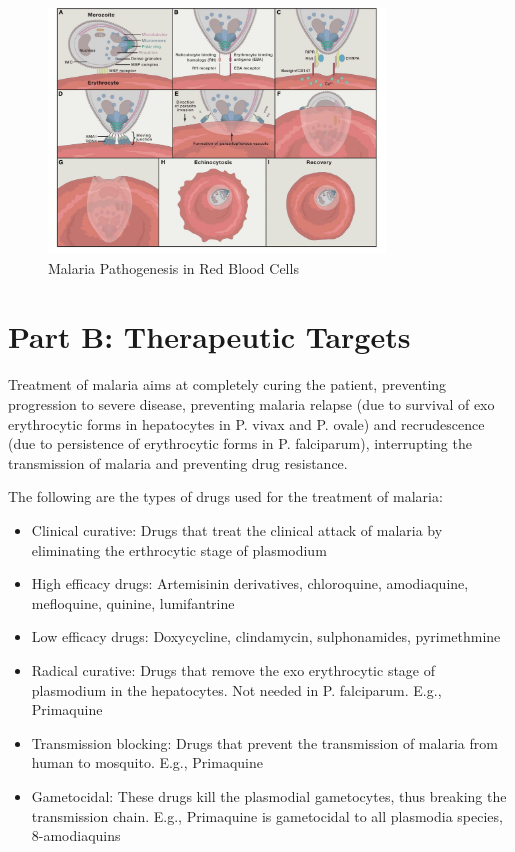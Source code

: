 \documentclass[twoside]{article}
\begin{document}
\begin{figure}[H]
    \centering
    \includegraphics[width=0.8\textwidth]{erythrocytemolmap.jpg}
    \caption{Malaria Pathogenesis in Red Blood Cells}
    \label{fig: Malaria Pathogenesis in Red Blood Cells}
\end{figure}


\section*{Part B: Therapeutic Targets}

\begin{multicols}{2}

    Treatment of malaria aims at completely curing the patient,
    preventing progression to severe disease, preventing malaria
    relapse (due to survival of exo erythrocytic forms in hepatocytes in P. vivax and P. ovale) and recrudescence 
    (due to persistence of erythrocytic forms in P. falciparum), interrupting
    the transmission of malaria and preventing drug resistance.

    The following are the types of drugs used for the treatment of malaria:
    \begin{itemize}
        \item Clinical curative: Drugs that treat the clinical attack of
        malaria by eliminating the erthrocytic stage of
        plasmodium
        \item High efficacy drugs: Artemisinin derivatives, chloroquine, amodiaquine, mefloquine, quinine, lumifantrine
        \item Low efficacy drugs: Doxycycline, clindamycin, sulphonamides, pyrimethmine
        \item Radical curative: Drugs that remove the exo erythrocytic stage of plasmodium in the hepatocytes. 
        Not needed in P. falciparum. E.g., Primaquine
        \item Transmission blocking: Drugs that prevent the transmission of malaria from human to mosquito. E.g., Primaquine
        \item Gametocidal: These drugs kill the plasmodial gametocytes, thus breaking the transmission chain. E.g.,
              Primaquine is gametocidal to all plasmodia species, 8-amodiaquins
    \end{itemize}
            
    
\end{multicols}
\end{document}
